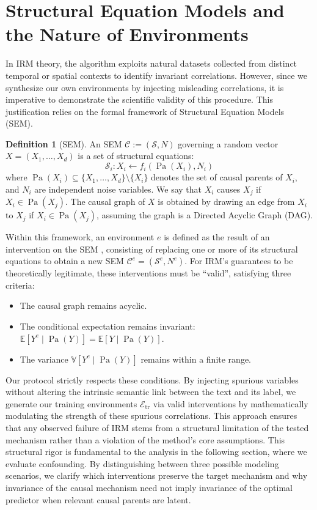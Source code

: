 \documentclass[11pt]{article}
\theoremstyle{definition}
\newtheorem{definition}{Definition}[section]
\theoremstyle{plain}
\begin{document}
\section{Structural Equation Models and the Nature of Environments}
\label{app:sem}

In IRM theory, the algorithm exploits natural datasets collected from distinct temporal or spatial contexts to identify invariant correlations. However, since we synthesize our own environments by injecting misleading correlations, it is imperative to demonstrate the scientific validity of this procedure. This justification relies on the formal framework of Structural Equation Models (SEM).

\begin{definition}[SEM]
An SEM $\mathcal{C} := (\mathcal{S}, N)$ governing a random vector $X = (X_1, \ldots, X_d)$ is a set of structural equations:
\[
\mathcal{S}_i: X_i \leftarrow f_i(\operatorname{Pa}(X_i), N_i)
\]
where $\operatorname{Pa}(X_i) \subseteq \{X_1, \ldots, X_d\} \setminus \{X_i\}$ denotes the set of causal parents of $X_i$, and $N_i$ are independent noise variables. We say that $X_i$ causes $X_j$ if $X_i \in \operatorname{Pa}(X_j)$. The causal graph of $X$ is obtained by drawing an edge from $X_i$ to $X_j$ if $X_i \in \operatorname{Pa}(X_j)$, assuming the graph is a Directed Acyclic Graph (DAG).
\end{definition}

Within this framework, an environment $e$ is defined as the result of an intervention on the SEM \citep{peters2016causal, arjovsky2019invariant}, consisting of replacing one or more of its structural equations to obtain a new SEM $\mathcal{C}^e = (\mathcal{S}^e, N^e)$. For IRM's guarantees to be theoretically legitimate, these interventions must be ``valid'', satisfying three criteria:
\begin{itemize}
\item The causal graph remains acyclic.
\item The conditional expectation remains invariant: $\mathbb{E}[Y^e \mid \operatorname{Pa}(Y)] = \mathbb{E}[Y \mid \operatorname{Pa}(Y)]$.
\item The variance $\mathbb{V}[Y^e \mid \operatorname{Pa}(Y)]$ remains within a finite range.
\end{itemize}

Our protocol strictly respects these conditions. By injecting spurious variables without altering the intrinsic semantic link between the text and its label, we generate our training environments $\mathcal{E}_{\text{tr}}$ via valid interventions by mathematically modulating the strength of these spurious correlations. This approach ensures that any observed failure of IRM stems from a structural limitation of the tested mechanism rather than a violation of the method's core assumptions. This structural rigor is fundamental to the analysis in the following section, where we evaluate confounding. By distinguishing between three possible modeling scenarios, we clarify which interventions preserve the target mechanism and why invariance of the causal mechanism need not imply invariance of the optimal predictor when relevant causal parents are latent.
\end{document}
